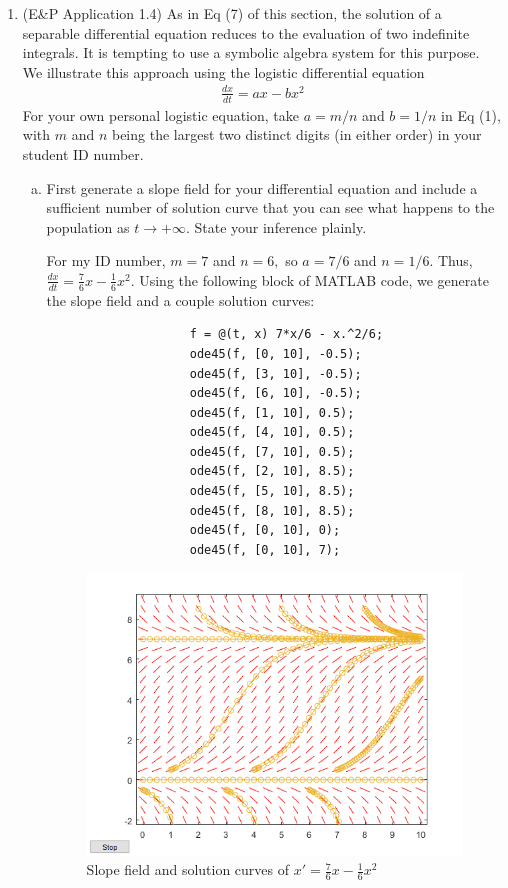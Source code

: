 \documentclass{article}
\begin{document}
\begin{enumerate}
		\newpage
	\item (E\&P Application 1.4) As in Eq (7) of this section, the solution of a separable differential equation reduces to the evaluation of two indefinite integrals. It is tempting to use a symbolic algebra system for this purpose. We illustrate this approach using the logistic differential equation
		\begin{align*}
			\frac{dx}{dt} = ax-bx^2 \tag{1}
		\end{align*}
		For your own personal logistic equation, take $a=m/n$ and $b=1/n$ in Eq (1), with $m$ and $n$ being the largest two distinct digits (in either order) in your student ID number.
		\begin{enumerate}[(a)]
			\item First generate a slope field for your differential equation and include a sufficient number of solution curve that you can see what happens to the population as $t\to+\infty.$ State your inference plainly.
				\begin{soln}
					For my ID number, $m=7$ and $n=6,$ so $a=7/6$ and $n=1/6.$ Thus, $\frac{dx}{dt} = \frac{7}{6}x - \frac{1}{6}x^2.$ Using the following block of MATLAB code, we generate the slope field and a couple solution curves:
					\begin{lstlisting}
					f = @(t, x) 7*x/6 - x.^2/6;
					ode45(f, [0, 10], -0.5);
					ode45(f, [3, 10], -0.5);
					ode45(f, [6, 10], -0.5);
					ode45(f, [1, 10], 0.5);
					ode45(f, [4, 10], 0.5);
					ode45(f, [7, 10], 0.5);
					ode45(f, [2, 10], 8.5);
					ode45(f, [5, 10], 8.5);
					ode45(f, [8, 10], 8.5);
					ode45(f, [0, 10], 0);
					ode45(f, [0, 10], 7);
					\end{lstlisting}
					\begin{figure}[ht]
						\centering
						\includegraphics[width=10cm]{5aslopefield}
						\caption{Slope field and solution curves of $x'=\frac{7}{6}x-\frac{1}{6}x^2$}

\end{figure}
\end{soln}
\end{enumerate}
\end{enumerate}
\end{document}
